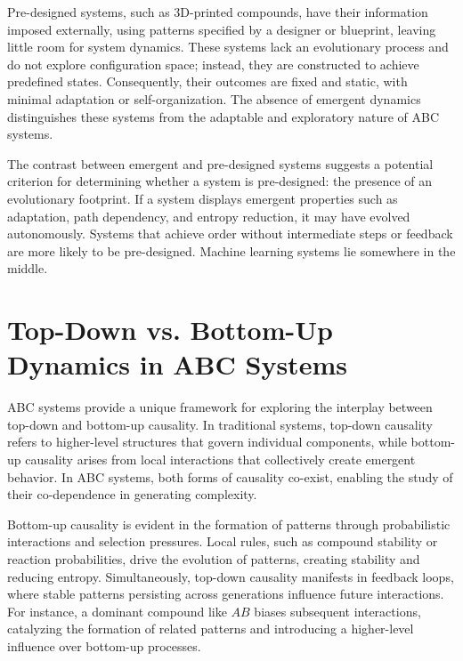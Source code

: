 \documentclass[entropy,article,submit,pdftex,moreauthors]{Definitions/mdpi}
\begin{document}
Pre-designed systems, such as 3D-printed compounds, have their information imposed externally, using patterns specified by a designer or blueprint, leaving little room for system dynamics. These systems lack an evolutionary process and do not explore configuration space; instead, they are constructed to achieve predefined states. Consequently, their outcomes are fixed and static, with minimal adaptation or self-organization. The absence of emergent dynamics distinguishes these systems from the adaptable and exploratory nature of ABC systems.

The contrast between emergent and pre-designed systems suggests a potential criterion for determining whether a system is pre-designed: the presence of an evolutionary footprint. If a system displays emergent properties such as adaptation, path dependency, and entropy reduction, it may have evolved autonomously. Systems that achieve order without intermediate steps or feedback are more likely to be pre-designed. Machine learning systems lie somewhere in the middle.


\section{Top-Down vs. Bottom-Up Dynamics in ABC Systems}

ABC systems provide a unique framework for exploring the interplay between top-down and bottom-up causality. In traditional systems, top-down causality refers to higher-level structures that govern individual components, while bottom-up causality arises from local interactions that collectively create emergent behavior. In ABC systems, both forms of causality co-exist, enabling the study of their co-dependence in generating complexity.

Bottom-up causality is evident in the formation of patterns through probabilistic interactions and selection pressures. Local rules, such as compound stability or reaction probabilities, drive the evolution of patterns, creating stability and reducing entropy. Simultaneously, top-down causality manifests in feedback loops, where stable patterns persisting across generations influence future interactions. For instance, a dominant compound like \( AB \) biases subsequent interactions, catalyzing the formation of related patterns and introducing a higher-level influence over bottom-up processes.
\end{document}
